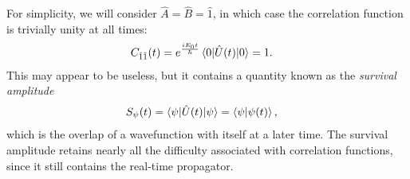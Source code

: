 For simplicity, we will consider $\hat{A} = \hat{B} = \hat{1}$, in which case the correlation function is trivially unity at all times:
\begin{align}
	C_{\hat{1} \hat{1}}(t)
	&= e^{\frac{i E_0 t}{\hbar}} \braket{0 | \hat{U}(t) | 0}
	= 1.
\end{align}
This may appear to be useless, but it contains a quantity known as the \emph{survival amplitude}~\cite{issack2007semiclassical}
\begin{align}
	S_{\psi}(t)
	&= \braket{\psi | \hat{U}(t) | \psi}
	= \braket{\psi | \psi(t)},
\end{align}
which is the overlap of a wavefunction with itself at a later time.
The survival amplitude retains nearly all the difficulty associated with correlation functions, since it still contains the real-time propagator.

